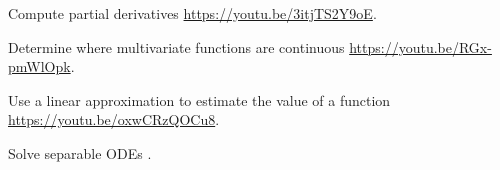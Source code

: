 \begin{readinessAssuranceResources}
\item Compute partial derivatives \url{https://youtu.be/3itjTS2Y9oE}.
\item Determine where multivariate functions are continuous \url{https://youtu.be/RGx-pmWlOpk}.
\item Use a linear approximation to estimate the value of a  function \url{https://youtu.be/oxwCRzQOCu8}.
\item Solve separable ODEs .
\end{readinessAssuranceResources}
